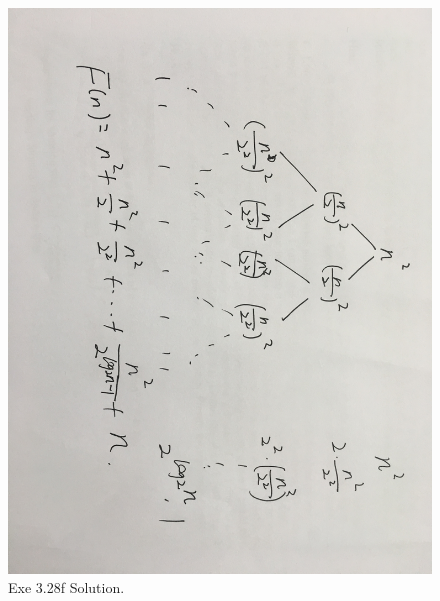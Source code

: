\subsection{}
\begin{figure}[H]
  \includegraphics[width=\linewidth]{EX28f.jpeg}
  \caption{Exe 3.28f Solution.}
  \label{fig:solution 3.28f}
\end{figure}

\subsection{}
